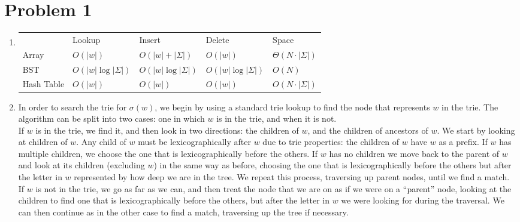 \documentclass{article}
\theoremstyle{casestyle}
\begin{document}
\section *{Problem 1}
\begin{enumerate}[i]
\item    \begin{tabular}{lllll}
      \cline{2-5}
            & Lookup & Insert & Delete & Space \\ \cline{2-5} 
           Array      & $O(\left|w\right|)$      & $O(\left|w\right| + \left|\Sigma\right|)$      & $O(\left| w\right|)$      & $\Theta(N\cdot\left|\Sigma\right|)$     \\
           BST        & $O(\left|w\right| \log {\left| \Sigma \right|})$      & $O(\left|w\right| \log {\left| \Sigma \right|})$  & $O(\left|w\right| \log {\left| \Sigma \right|})$   & $O(N)$     \\
           Hash Table & $O(\left|w\right|)$      & $O(\left|w\right|)$      & $O(\left|w\right|)$      &     $O(N\cdot\left|\Sigma\right|)$
    \end{tabular}
  
  \item In order to search the trie for $\sigma(w)$, we begin by using a standard trie lookup to find the node that represents $w$ in the trie. The algorithm can be split into two cases: one in which $w$ is in the trie, and when it is not.\\

If $w$ is in the trie, we find it, and then look in two directions: the children of $w$, and the children of ancestors of $w$. We start by looking at children of $w$. Any child of $w$ must be lexicographically after $w$ due to trie properties: the children of $w$ have $w$ as a prefix. If $w$ has multiple children, we choose the one that is lexicographically before the others. If $w$ has no children we move back to the parent of $w$ and look at its children (excluding $w$) in the same way as before, choosing the one that is lexicographically before the others but after the letter in $w$ represented by how deep we are in the tree. We repeat this process, traversing up parent nodes, until we find a match. \\

If $w$ is not in the trie, we go as far as we can, and then treat the node that we are on as if we were on a ``parent'' node, looking at the children to find one that is lexicographically before the others, but after the letter in $w$ we were looking for during the traversal. We can then continue as in the other case to find a match, traversing up the tree if necessary. \\


\end{enumerate}
\end{document}

